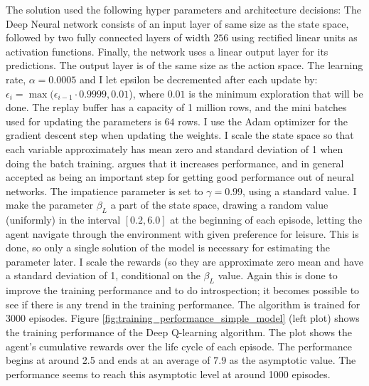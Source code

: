 The solution used the following hyper parameters and architecture decisions: The Deep Neural network consists of an input layer of same size as the state space, followed by two fully connected layers of width $256$ using rectified linear units as activation functions. Finally, the network uses a linear output layer for its predictions. The output layer is of the same size as the action space. The learning rate, $\alpha=0.0005$ and I let epsilon be decremented after each update by: $\epsilon_i = \max (\epsilon_{i-1} \cdot 0.9999, 0.01$), where $0.01$ is the minimum exploration that will be done. The replay buffer has a capacity of 1 million rows, and the mini batches used for updating the parameters is $64$ rows. I use the Adam optimizer for the gradient descent step when updating the weights. I scale the state space so that each variable approximately has mean zero and standard deviation of 1 when doing the batch training. \textcite{goodfellow_deep_2016} argues that it increases performance, and in general accepted as being an important step for getting good performance out of neural networks. The impatience parameter is set to $\gamma=0.99$, using a standard value. I make the parameter $\beta_L$ a part of the state space, drawing a random value (uniformly) in the interval $[0.2, 6.0]$ at the beginning of each episode, letting the agent navigate through the environment with given preference for leisure. This is done, so only a single solution of the model is necessary for estimating the parameter later. I scale the rewards (so they are approximate zero mean and have a standard deviation of 1, conditional on the $\beta_L$ value. Again this is done to improve the training performance and to do introspection; it becomes possible to see if there is any trend in the training performance. The algorithm is trained for 3000 episodes. Figure \ref{fig:training_performance_simple_model}  (left plot) shows the training performance of the Deep Q-learning algorithm. The plot shows the agent's cumulative rewards over the life cycle of each episode. The performance begins at around 2.5 and ends at an average of $7.9$ as the asymptotic value. The performance seems to reach this asymptotic level at around 1000 episodes. 


